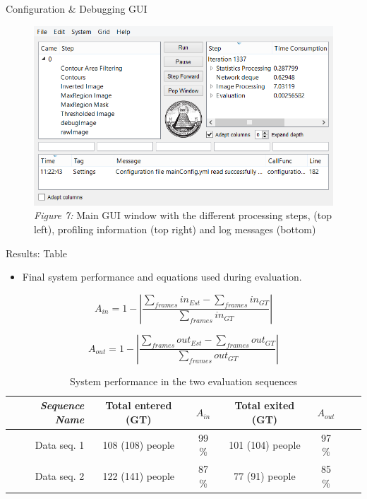 \documentclass[final,hyperref={pdfpagelabels=false}]{beamer}
\begin{document}
\begin{frame}[t]
\begin{columns}[t]
\begin{column}{.465\textwidth}
\begin{block}{Configuration \& Debugging GUI}
\begin{figure}
\includegraphics[width=0.9\linewidth]{PosterDebuggerCrop.png}
\caption{\centering \textit{Figure 7:} Main GUI window with the different processing steps, (top left), profiling information (top right) and log messages (bottom)}
\end{figure}

\end{block}




\begin{block}{Results: Table}

\begin{itemize}
\item Final system performance and equations used during evaluation.
\end{itemize}

\begin{equation}
\label{eq:in_accuracy}
A_{in} = 1 - |\frac{\sum_{frames}{in_{Est}}-\sum_{frames}{in_{GT}}}{\sum_{frames}in_{GT}}|
\end{equation} 

\begin{equation}
\label{eq:out_accuracy}
A_{out} = 1 - |\frac{\sum_{frames}{out_{Est}}-\sum_{frames}out_{GT}}{\sum_{frames}out_{GT}}| 
\end{equation} 


\begin{table}[h]
\centering
	\begin{tabular}{r | c | c | c | c | c | c }
		\emph{Sequence Name}		&  Total entered (GT) & \emph{$A_{in}$} & Total exited (GT) & \emph{$A_{out}$} \\
		\hline \hline
		Data seq. 1			& 108 (108) people & 99 \% & 101 (104) people & 97 \% \\
		Data seq. 2			& 122 (141) people & 87 \% & 77 (91) people & 85 \%  \\
		\end{tabular}
	\caption{System performance in the two evaluation sequences}
\end{table}


\end{block}
\end{column}
\end{columns}
\end{frame}
\end{document}
